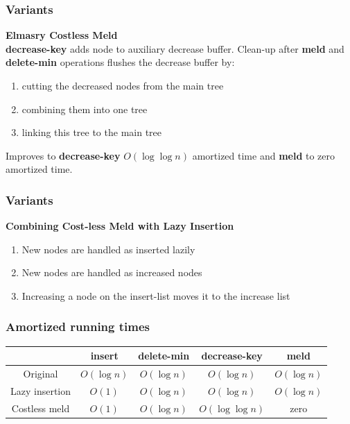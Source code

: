 \documentclass{beamer}
\begin{document}
\begin{frame}
\frametitle{Variants}

\textbf{Elmasry Costless Meld}\\

\textbf{decrease-key} adds node to auxiliary decrease buffer.
Clean-up after \textbf{meld} and \textbf{delete-min} operations
flushes the decrease buffer by:
\begin{enumerate}
\item cutting the decreased nodes from the main tree
\item combining them into one tree
\item linking this tree to the main tree
\end{enumerate}

Improves to \textbf{decrease-key} $O(\log \log n)$ amortized time and \textbf{meld}
to zero amortized time.

\end{frame}


\begin{frame}
\frametitle{Variants}

\textbf{Combining Cost-less Meld with Lazy Insertion}\\

\begin{enumerate}
\item New nodes are handled as inserted lazily
\item New nodes are handled as increased nodes
\item Increasing a node on the insert-list moves it to the increase list
\end{enumerate}

\end{frame}



\begin{frame}
\frametitle{Amortized running times}

\begin{tabular}{|c|c|c|c|c|}
\hline
& \textbf{insert} & \textbf{delete-min} & \textbf{decrease-key} & \textbf{meld} \\
\hline
Original & $O(\log n)$ & $O(\log n)$ & $O(\log n)$ & $O(\log n)$ \\
\hline
Lazy insertion & $O(1)$ & $O(\log n)$ & $O(\log n)$ & $O(\log n)$ \\
\hline
Costless meld & $O(1)$ & $O(\log n)$ & $O(\log \log n)$ & zero \\
\hline
\end{tabular}

\end{frame}
\end{document}
